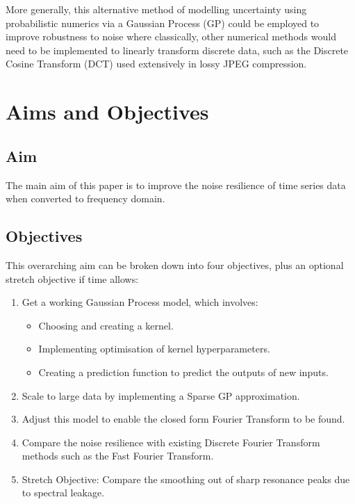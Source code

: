 \documentclass[12pt]{article}
\begin{document}
    More generally, this alternative method of modelling uncertainty using probabilistic numerics via a Gaussian Process (GP) could be employed to improve robustness to noise where classically, other numerical methods would need to be implemented to linearly transform discrete data, such as the Discrete Cosine Transform (DCT) used extensively in lossy JPEG compression.~\cite{StanfordJPEGDCT}

    \section{Aims and Objectives}
    \subsection{Aim}
    The main aim of this paper is to improve the noise resilience of time series data when converted to frequency domain.

    \subsection{Objectives}
    This overarching aim can be broken down into four objectives, plus an optional stretch objective if time allows:
        \begin{enumerate}
            \item Get a working Gaussian Process model, which involves:
                \begin{itemize}
                    \item Choosing and creating a kernel.
                    \item Implementing optimisation of kernel hyperparameters. \label{item:nll}
                    \item Creating a prediction function to predict the outputs of new inputs. \label{item:predict}
                \end{itemize}
            \item Scale to large data by implementing a Sparse GP approximation.
            \item Adjust this model to enable the closed form Fourier Transform to be found.
            \item Compare the noise resilience with existing Discrete Fourier Transform methods such as the Fast Fourier Transform.\label{noise-resilience}
            \item Stretch Objective: Compare the smoothing out of sharp resonance peaks due to spectral leakage.\label{stretch-obj}
        \end{enumerate}
\end{document}

